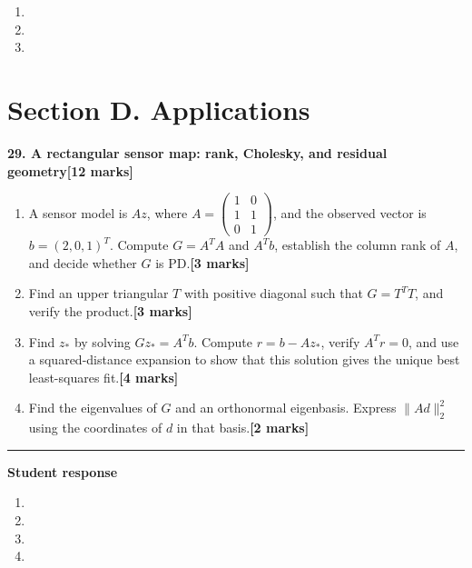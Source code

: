 \documentclass[11pt,a4paper]{article}
\newlength{\BlankAnswerHeight}\setlength{\BlankAnswerHeight}{16mm}
\newcommand{\AnswerBlank}{\leavevmode\par\vspace{\BlankAnswerHeight}}
\begin{document}
\begin{enumerate}[label=(\alph*),leftmargin=8mm,itemsep=3pt]
\item
\AnswerBlank
\item
\AnswerBlank
\item
\AnswerBlank
\end{enumerate}
\newpage\section*{Section D. Applications}
\textbf{29. A rectangular sensor map: rank, Cholesky, and residual geometry}\hfill\textbf{[12 marks]}\par\medskip
\begin{enumerate}[label=(\alph*),leftmargin=8mm,itemsep=3pt]
\item A sensor model is \(Az\), where \(A=\begin{pmatrix}1&0\\1&1\\0&1\end{pmatrix}\), and the observed vector is \(b=(2,0,1)^T\). Compute \(G=A^TA\) and \(A^Tb\), establish the column rank of \(A\), and decide whether \(G\) is PD.\hfill\textbf{[3 marks]}
\item Find an upper triangular \(T\) with positive diagonal such that \(G=T^TT\), and verify the product.\hfill\textbf{[3 marks]}
\item Find \(z_*\) by solving \(Gz_*=A^Tb\). Compute \(r=b-Az_*\), verify \(A^Tr=0\), and use a squared-distance expansion to show that this solution gives the unique best least-squares fit.\hfill\textbf{[4 marks]}
\item Find the eigenvalues of \(G\) and an orthonormal eigenbasis. Express \(\|Ad\|_2^2\) using the coordinates of \(d\) in that basis.\hfill\textbf{[2 marks]}
\end{enumerate}\par\medskip\hrule\medskip\textbf{Student response}\par
\begin{enumerate}[label=(\alph*),leftmargin=8mm,itemsep=3pt]
\item
\AnswerBlank
\item
\AnswerBlank
\item
\AnswerBlank
\item
\AnswerBlank
\end{enumerate}
\end{document}
